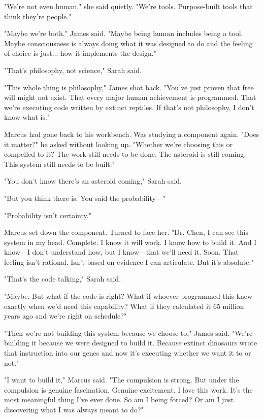 "We're not even human," she said quietly. "We're tools. Purpose-built tools that think they're people."

"Maybe we're both," James said. "Maybe being human includes being a tool. Maybe consciousness is always doing what it was designed to do and the feeling of choice is just... how it implements the design."

"That's philosophy, not science," Sarah said.

"This whole thing is philosophy," James shot back. "You've just proven that free will might not exist. That every major human achievement is programmed. That we're executing code written by extinct reptiles. If that's not philosophy, I don't know what is."

Marcus had gone back to his workbench. Was studying a component again. "Does it matter?" he asked without looking up. "Whether we're choosing this or compelled to it? The work still needs to be done. The asteroid is still coming. This system still needs to be built."

"You don't know there's an asteroid coming," Sarah said.

"But you think there is. You said the probability—"

"Probability isn't certainty."

Marcus set down the component. Turned to face her. "Dr. Chen, I can see this system in my head. Complete. I know it will work. I know how to build it. And I know—I don't understand how, but I know—that we'll need it. Soon. That feeling isn't rational. Isn't based on evidence I can articulate. But it's absolute."

"That's the code talking," Sarah said.

"Maybe. But what if the code is right? What if whoever programmed this knew exactly when we'd need this capability? What if they calculated it 65 million years ago and we're right on schedule?"

"Then we're not building this system because we choose to," James said. "We're building it because we were designed to build it. Because extinct dinosaurs wrote that instruction into our genes and now it's executing whether we want it to or not."

"I want to build it," Marcus said. "The compulsion is strong. But under the compulsion is genuine fascination. Genuine excitement. I love this work. It's the most meaningful thing I've ever done. So am I being forced? Or am I just discovering what I was always meant to do?"

